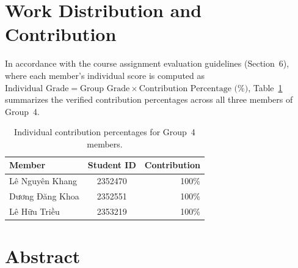 \documentclass[12pt,a4paper]{article}
\begin{document}
\setcounter{page}{1}

\section*{Work Distribution and Contribution}

In accordance with the course assignment evaluation guidelines (Section~6), where each member's individual score is computed as $\text{Individual Grade} = \text{Group Grade} \times \text{Contribution Percentage (\%)}$, Table~\ref{tab:work_distribution} summarizes the verified contribution percentages across all three members of Group~4.

\begin{table}[H]
  \centering
  \caption[Group member contribution percentages]{Individual contribution percentages for Group~4 members.}
  \label{tab:work_distribution}
  \small
  \setlength{\tabcolsep}{10pt}
  \begin{tabularx}{\textwidth}{@{}X c r@{}}
    \toprule
    \textbf{Member} & \textbf{Student ID} & \textbf{Contribution} \\
    \midrule
    Lê Nguyên Khang & 2352470 & 100\% \\
    Dương Đăng Khoa & 2352551 & 100\% \\
    Lê Hữu Triều    & 2353219 & 100\% \\
    \bottomrule
  \end{tabularx}
\end{table}

\clearpage
\section*{Abstract}
\end{document}
